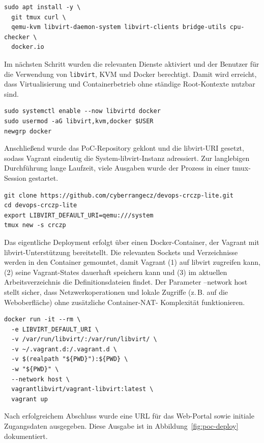 \begin{verbatim}
sudo apt install -y \
  git tmux curl \
  qemu-kvm libvirt-daemon-system libvirt-clients bridge-utils cpu-checker \
  docker.io
\end{verbatim}

Im nächsten Schritt wurden die relevanten Dienste aktiviert und der Benutzer für die Verwendung von
\texttt{libvirt}, KVM und Docker berechtigt. Damit wird erreicht, dass Virtualisierung und Containerbetrieb
ohne ständige Root-Kontexte nutzbar sind.

\begin{verbatim}
sudo systemctl enable --now libvirtd docker
sudo usermod -aG libvirt,kvm,docker $USER
newgrp docker
\end{verbatim}

Anschließend wurde das PoC-Repository geklont und die libvirt-URI gesetzt, sodass Vagrant eindeutig
die System-libvirt-Instanz adressiert. Zur langlebigen Durchführung lange Laufzeit, viele Ausgaben
wurde der Prozess in einer tmux-Session gestartet.

\begin{verbatim}
git clone https://github.com/cyberrangecz/devops-crczp-lite.git
cd devops-crczp-lite
export LIBVIRT_DEFAULT_URI=qemu:///system
tmux new -s crczp
\end{verbatim}

Das eigentliche Deployment erfolgt über einen Docker-Container, der Vagrant mit libvirt-Unterstützung
bereitstellt. Die relevanten Sockets und Verzeichnisse werden in den Container gemountet, damit Vagrant
(1) auf libvirt zugreifen kann, (2) seine Vagrant-States dauerhaft speichern kann und (3) im aktuellen
Arbeitsverzeichnis die Definitionsdateien findet. Der Parameter --network host stellt sicher, dass
Netzwerkoperationen und lokale Zugriffe (z.\,B. auf die Weboberfläche) ohne zusätzliche Container-NAT-
Komplexität funktionieren.

\begin{verbatim}
docker run -it --rm \
  -e LIBVIRT_DEFAULT_URI \
  -v /var/run/libvirt/:/var/run/libvirt/ \
  -v ~/.vagrant.d:/.vagrant.d \
  -v $(realpath "${PWD}"):${PWD} \
  -w "${PWD}" \
  --network host \
  vagrantlibvirt/vagrant-libvirt:latest \
  vagrant up
\end{verbatim}

Nach erfolgreichem Abschluss wurde eine URL für das Web-Portal sowie initiale Zugangsdaten ausgegeben.
Diese Ausgabe ist in Abbildung~\ref{fig:poc-deploy} dokumentiert. 


